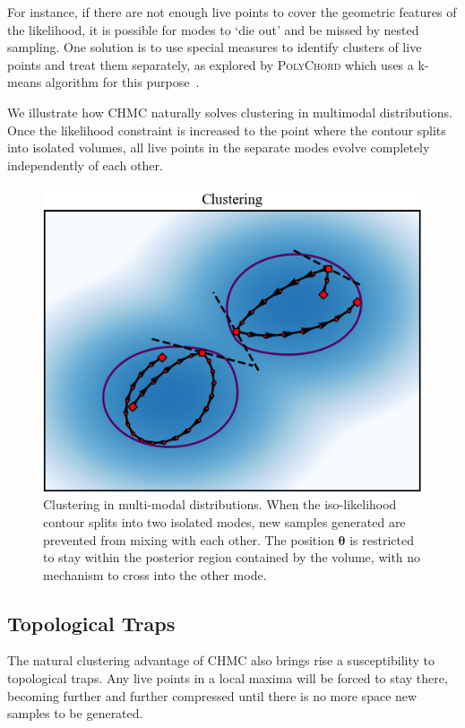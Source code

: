 \documentclass[11pt]{article}
\begin{document}
    For instance, if there are not enough live points to cover the geometric features of the likelihood, it is
    possible for modes to `die out' and be missed by nested sampling.
    One solution is to use special measures to identify clusters of live points and treat them separately,
    as explored by \textsc{PolyChord} which uses a k-means algorithm for this purpose~\cite{Handley_polychord}.

    We illustrate how CHMC naturally solves clustering in multimodal distributions.
    Once the likelihood constraint is increased to the point where the contour splits into isolated volumes,
    all live points in the separate modes evolve completely independently of each other.

    \begin{figure}[h!]
        \center
        \includegraphics[width=\linewidth]{../figures/Clustering}
        \caption{
        Clustering in multi-modal distributions. When the iso-likelihood contour splits into
        two isolated modes, new samples generated are prevented from mixing with each other.
        The position $\mathbf{\theta}$ is restricted to stay within the posterior region contained by the volume,
        with no mechanism to cross into the other mode.
        }\label{fig:clustering}
    \end{figure}

\subsection{Topological Traps}\label{subsec:topological_trap}
    The natural clustering advantage of CHMC also brings rise a susceptibility to topological traps.
    Any live points in a local maxima will be forced to stay there, becoming further and further compressed until there
    is no more space new samples to be generated.
\end{document}
